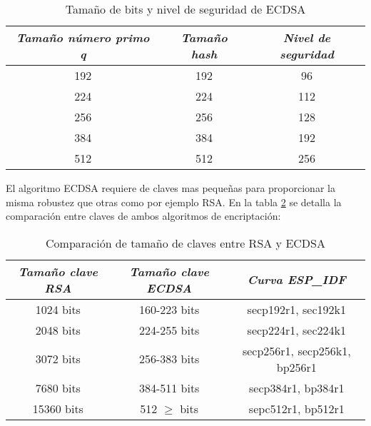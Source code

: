 \begin{table}[H]
    \centering
    \begin{tabular}{ |c|c|c| }
        \hline
        \textit{Tamaño número primo q} & \textit{Tamaño hash} & \textit{Nivel de seguridad} \\
        \hline
        192                            & 192                  & 96                          \\
        224                            & 224                  & 112                         \\
        256                            & 256                  & 128                         \\
        384                            & 384                  & 192                         \\
        512                            & 512                  & 256                         \\
        \hline
    \end{tabular}
    \caption{Tamaño de bits y nivel de seguridad de ECDSA}
    \label{tab:bit-len-sec-level}
\end{table}

El algoritmo ECDSA requiere de claves mas pequeñas para proporcionar la misma robustez que otras como por ejemplo RSA. En la
tabla \ref{tab:rsa-vs-ecdsa} se detalla la comparación entre claves de ambos algoritmos de encriptación:

\begin{table}[H]
    \centering
    \begin{tabular}{ |c|c|c| }
        \hline
        \textit{Tamaño clave RSA} & \textit{Tamaño clave ECDSA} & \textit{Curva ESP\_IDF}        \\
        \hline
        1024 bits                 & 160-223 bits                & secp192r1, sec192k1           \\
        2048 bits                 & 224-255 bits                & secp224r1, sec224k1           \\
        3072 bits                 & 256-383 bits                & secp256r1, secp256k1, bp256r1 \\
        7680 bits                 & 384-511 bits                & secp384r1, bp384r1            \\
        15360 bits                & 512 $\ge$ bits              & sepc512r1, bp512r1            \\
        \hline
    \end{tabular}
    \caption{Comparación de tamaño de claves entre RSA y ECDSA}
    \label{tab:rsa-vs-ecdsa}
\end{table}


